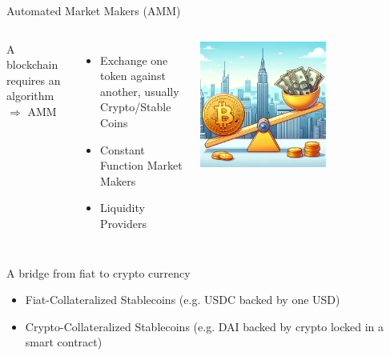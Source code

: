 \documentclass{beamer}
\begin{document}
\begin{frame}{Automated Market Makers (AMM)}
\begin{columns}
\footnotesize
A blockchain requires an algorithm $\Rightarrow$ AMM
\begin{itemize}
  \item Exchange one token against another, usually Crypto/Stable Coins

  \item Constant Function Market Makers
  \item Liquidity Providers
  \end{itemize}
  \begin{center}
\includegraphics[width=0.6\textwidth]{../../Figures/DALL-E/AMM_BTC_AUSD.png}
\end{center}
  \end{columns}
    \begin{tcolorbox}[enhanced,drop shadow, title=Stable Coin]
    A bridge from fiat to crypto currency
    \begin{itemize}
      \item Fiat-Collateralized Stablecoins (e.g. USDC backed by one USD)
      \item Crypto-Collateralized Stablecoins (e.g. DAI backed by crypto locked in a smart contract)
    \end{itemize}
\end{tcolorbox}

\end{frame}
\end{document}
